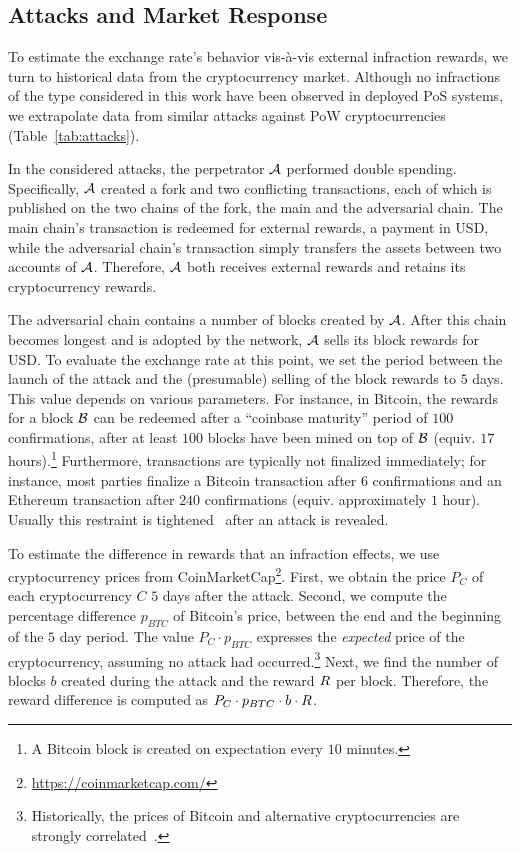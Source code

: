 \subsection{Attacks and Market Response}\label{sec:attacks}

To estimate the exchange rate's behavior vis-à-vis external infraction rewards,
we turn to historical data from the cryptocurrency market. Although no
infractions of the type considered in this work have been observed in
deployed PoS systems, we extrapolate data from similar attacks against PoW
cryptocurrencies (Table~\ref{tab:attacks}).

In the considered attacks, the perpetrator $\mathcal{A}$ performed double
spending. Specifically, $\mathcal{A}$ created a fork and two conflicting
transactions, each of which is published on the two chains of the fork, the
main and the adversarial chain. The main chain's transaction is redeemed for
external rewards, \eg a payment in USD, while the adversarial chain's
transaction simply transfers the assets between two accounts of $\mathcal{A}$.
Therefore, $\mathcal{A}$ both receives external rewards and retains its
cryptocurrency rewards.

The adversarial chain contains a number of blocks created by $\mathcal{A}$.
After this chain becomes longest and is adopted by the network,
$\mathcal{A}$ sells its block rewards for USD.  To evaluate the exchange rate at
this point, we set the period between the launch of the attack and the
(presumable) selling of the block rewards to $5$ days. This value depends on
various parameters. For instance, in Bitcoin, the rewards for a block $\mathcal{B}$
can be redeemed after a ``coinbase maturity'' period of $100$ confirmations,
\ie after at least $100$ blocks have been mined on top of $\mathcal{B}$ (equiv. $17$
hours).\footnote{A Bitcoin
block is created on expectation every $10$ minutes.}
Furthermore, transactions are typically not finalized immediately; for
instance, most parties finalize a Bitcoin transaction after $6$ confirmations
and an Ethereum transaction after $240$ confirmations (equiv. approximately $1$
hour).
Usually this restraint is tightened~\cite{etc-attack-4} after an
attack is revealed.

To estimate the difference in rewards that an infraction effects, we use
cryptocurrency prices from
CoinMarketCap\footnote{\url{https://coinmarketcap.com/}}. First, we obtain the
price $P_{C}$ of each cryptocurrency $C$ $5$ days after the attack. Second, we
compute the percentage difference $p_{BTC}$ of Bitcoin's price, between the end
and the beginning of the $5$ day period. The value $P_{C} \cdot p_{BTC}$
expresses the \emph{expected} price of the cryptocurrency, assuming no attack
had occurred.\footnote{Historically, the prices of Bitcoin and alternative
cryptocurrencies are strongly correlated~\cite{btc-price-correlation}.} Next,
we find the number of blocks $b$ created during the attack and the reward
$R$ per block. Therefore, the reward difference is computed as $P_{C}
\cdot p_{BTC} \cdot b \cdot R$.

